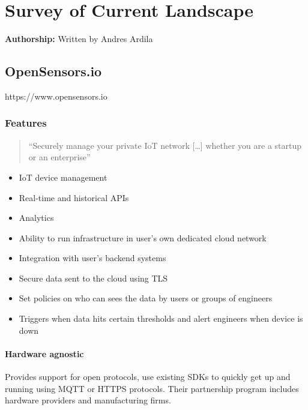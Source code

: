 \section{Survey of Current Landscape}\label{survey-of-current-landscape}

\vspace{8 pt}
\textbf{Authorship:} Written by Andres Ardila
\vspace{10 pt}

\subsection{OpenSensors.io}\label{opensensors.io}

https://www.opensensors.io

\subsubsection{Features}\label{features}

\begin{quote}
``Securely manage your private IoT network {[}\ldots{}{]} whether you
are a startup or an enterprise''
\end{quote}

\begin{itemize}
\tightlist
\item
  IoT device management
\item
  Real-time and historical APIs
\item
  Analytics
\item
  Ability to run infrastructure in user's own dedicated cloud network
\item
  Integration with user's backend systems
\item
  Secure data sent to the cloud using TLS
\item
  Set policies on who can sees the data by users or groups of engineers
\item
  Triggers when data hits certain thresholds and alert engineers when
  device is down
\end{itemize}

\paragraph{Hardware agnostic}\label{hardware-agnostic}

Provides support for open protocols, use existing SDKs to quickly get up
and running using MQTT or HTTPS protocols. Their partnership program
includes hardware providers and manufacturing firms.

